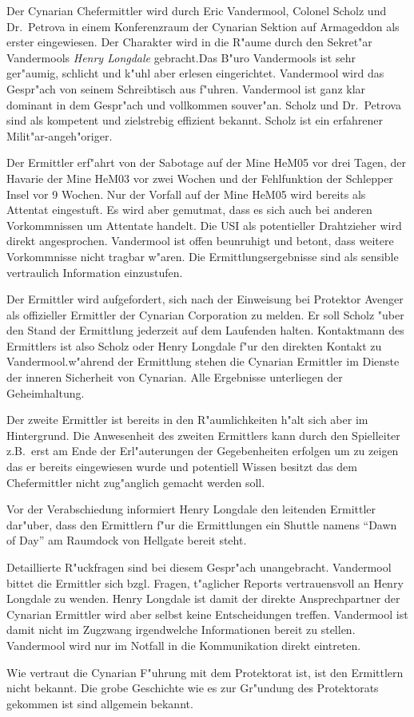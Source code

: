 
Der Cynarian Chefermittler wird durch Eric Vandermool, Colonel Scholz und Dr.~Petrova in einem Konferenzraum der Cynarian Sektion auf Armageddon als erster eingewiesen. Der Charakter wird in die R"aume durch den Sekret"ar Vandermools \emph{Henry Longdale} gebracht.Das B"uro Vandermools ist sehr ger"aumig, schlicht und k"uhl aber erlesen eingerichtet. Vandermool wird das Gespr"ach von seinem Schreibtisch aus f"uhren. Vandermool ist ganz klar dominant in dem Gespr"ach und vollkommen souver"an. Scholz und Dr.~Petrova sind als kompetent und zielstrebig effizient bekannt. Scholz ist ein erfahrener Milit"ar-angeh"origer.

Der Ermittler erf"ahrt von der Sabotage auf der Mine HeM05 vor drei Tagen, der Havarie der Mine HeM03 vor zwei Wochen und der Fehlfunktion der Schlepper Insel vor 9 Wochen. Nur der Vorfall auf der Mine HeM05 wird bereits als Attentat eingestuft. Es wird aber gemutma\3t, dass es sich auch bei anderen Vorkommnissen um Attentate handelt. Die USI als potentieller Drahtzieher wird direkt angesprochen. Vandermool ist offen beunruhigt und betont, dass weitere Vorkommnisse nicht tragbar w"aren. Die Ermittlungsergebnisse sind als sensible vertraulich Information einzustufen. 

Der Ermittler wird aufgefordert, sich nach der Einweisung bei Protektor Avenger als offizieller Ermittler der Cynarian Corporation zu melden. Er soll Scholz "uber den Stand der Ermittlung jederzeit auf dem Laufenden halten. Kontaktmann des Ermittlers ist also Scholz oder Henry Longdale f"ur den direkten Kontakt zu Vandermool.w"ahrend der Ermittlung stehen die Cynarian Ermittler im Dienste der inneren Sicherheit von Cynarian. Alle Ergebnisse unterliegen der Geheimhaltung.

Der zweite Ermittler ist bereits in den R"aumlichkeiten h"alt sich aber im Hintergrund. Die Anwesenheit des zweiten Ermittlers kann durch den Spielleiter z.B.~erst am Ende der Erl"auterungen der Gegebenheiten erfolgen um zu zeigen das er bereits eingewiesen wurde und potentiell Wissen besitzt das dem Chefermittler nicht zug"anglich gemacht werden soll.

Vor der Verabschiedung informiert Henry Longdale den leitenden Ermittler dar"uber, dass den Ermittlern f"ur die Ermittlungen ein Shuttle namens "`Dawn of Day"' am Raumdock von Hellgate bereit steht.


\begin{remarks}	
	Detaillierte R"uckfragen sind bei diesem Gespr"ach unangebracht. Vandermool bittet die Ermittler sich bzgl. Fragen, t"aglicher Reports vertrauensvoll an Henry Longdale zu wenden. Henry Longdale ist damit der direkte Ansprechpartner der Cynarian Ermittler wird aber selbst keine Entscheidungen treffen. Vandermool ist damit nicht im Zugzwang irgendwelche Informationen bereit zu stellen. Vandermool wird nur im Notfall in die Kommunikation direkt eintreten.

	Wie vertraut die Cynarian F"uhrung mit dem Protektorat ist, ist den Ermittlern nicht bekannt. Die grobe Geschichte  wie es zur Gr"undung des Protektorats gekommen ist sind allgemein bekannt.

\end{remarks}


